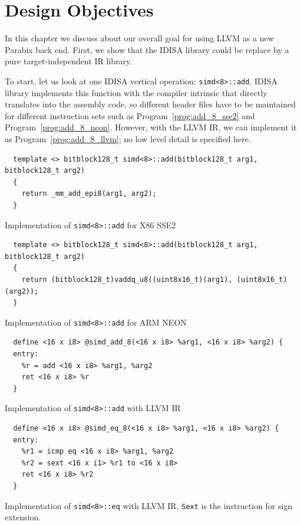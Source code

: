 \chapter{Design Objectives}
\label{three}

In this chapter we discuss about our overall goal for using LLVM as a new Parabix back end. First, we show that the IDISA library could be replace by a pure target-independent IR library.

To start, let us look at one IDISA vertical operation: {\tt simd<8>::add}. IDISA library implements this function with the compiler intrinsic that directly translates into the assembly code, so different header files have to be maintained for different instruction sets such as Program~\ref{prog:add_8_sse2} and Program~\ref{prog:add_8_neon}. However, with the LLVM IR, we can implement it as Program~\ref{prog:add_8_llvm}; no low level detail is specified here.

\begin{program}
\begin{verbatim}
  template <> bitblock128_t simd<8>::add(bitblock128_t arg1, bitblock128_t arg2)
  {
    return _mm_add_epi8(arg1, arg2);
  }
\end{verbatim}
\caption{Implementation of {\tt simd<8>::add} for X86 SSE2}
\label{prog:add_8_sse2}
\end{program}

\begin{program}
\begin{verbatim}
  template <> bitblock128_t simd<8>::add(bitblock128_t arg1, bitblock128_t arg2)
  {
    return (bitblock128_t)vaddq_u8((uint8x16_t)(arg1), (uint8x16_t)(arg2));
  }
\end{verbatim}
\caption{Implementation of {\tt simd<8>::add} for ARM NEON}
\label{prog:add_8_neon}
\end{program}

\begin{program}
\begin{verbatim}
  define <16 x i8> @simd_add_8(<16 x i8> %arg1, <16 x i8> %arg2) {
  entry:
    %r = add <16 x i8> %arg1, %arg2
    ret <16 x i8> %r
  }
\end{verbatim}
\caption{Implementation of {\tt simd<8>::add} with LLVM IR}
\label{prog:add_8_llvm}
\end{program}

\begin{program}
\begin{verbatim}
  define <16 x i8> @simd_eq_8(<16 x i8> %arg1, <16 x i8> %arg2) {
  entry:
    %r1 = icmp eq <16 x i8> %arg1, %arg2
    %r2 = sext <16 x i1> %r1 to <16 x i8>
    ret <16 x i8> %r2
  }
\end{verbatim}
\caption[Implementation of {\tt simd<8>::eq} with LLVM IR]{Implementation of {\tt simd<8>::eq} with LLVM IR. {\tt Sext} is the instruction for sign extension.}
\label{prog:icmp}
\end{program}

